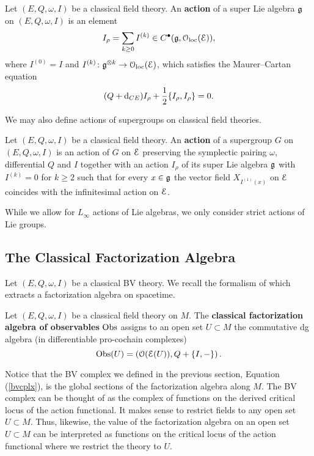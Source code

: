 \documentclass[10pt, oneside]{article}
\begin{document}
\begin{definition}
\label{infinitesimal_action_def}
Let $(E, Q,\omega, I)$ be a classical field theory. An {\bf action} of a super Lie algebra $\mathfrak g$ on $(E, Q, \omega, I)$ is an element
\[I_{\rho} = \sum_{k\geq 0} I^{(k)}\in C^\bullet(\mathfrak g, \mathcal{O}_{\rm loc}(\mathcal E)),\]
where $I^{(0)} = I$ and $I^{(k)}\colon \mathfrak g^{\otimes k}\rightarrow \mathcal{O}_{\rm loc}(\mathcal E)$, which satisfies the Maurer--Cartan equation
\[(Q + {\rm d}_{CE}) I_\rho + \frac{1}{2} \{I_\rho, I_\rho\} = 0.\]
\end{definition}

We may also define actions of supergroups on classical field theories.

\begin{definition}
\label{group_action_def}
Let $(E, Q, \omega, I)$ be a classical field theory. An {\bf action} of a supergroup $G$ on $(E, Q, \omega, I)$ is an action of $G$ on $\mathcal E$ preserving the symplectic pairing $\omega$, differential $Q$ and $I$ together with an action $I_\rho$ of its super Lie algebra $\mathfrak g$ with $I^{(k)} = 0$ for $k\geq 2$ such that for every $x\in\mathfrak g$ the vector field $X_{I^{(1)}(x)}$ on $\mathcal E$ coincides with the infinitesimal action on $\mathcal E$.
\end{definition}

\begin{remark}
While we allow for $L_\infty$ actions of Lie algebras, we only consider strict actions of Lie groups.
\end{remark}

\subsection{The Classical Factorization Algebra}

Let $(E, Q, \omega, I)$ be a classical BV theory. We recall the formalism of \cite{Book1,Book2} which extracts a factorization algebra on spacetime.

\begin{definition}
Let $(E, Q, \omega, I)$ be a classical field theory on $M$. The {\bf classical factorization algebra of observables} $\mathrm{Obs}$ assigns to an open set $U \subset M$ the commutative dg algebra (in differentiable pro-cochain complexes)
\[
\mathrm{Obs}(U) = \left(\mathcal O(\mathcal E(U)) , Q + \{I,-\}\right) .
\]
\end{definition}

Notice that the BV complex we defined in the previous section, Equation (\ref{bvcplx}), is the global sections of the factorization algebra along $M$.
The BV complex can be thought of as the complex of functions on the derived critical locus of the action functional.
It makes sense to restrict fields to any open set $U \subset M$. 
Thus, likewise, the value of the factorization algebra on an open set $U \subset M$ can be interpreted as functions on the critical locus of the action functional where we restrict the theory to $U$. 
\end{document}
